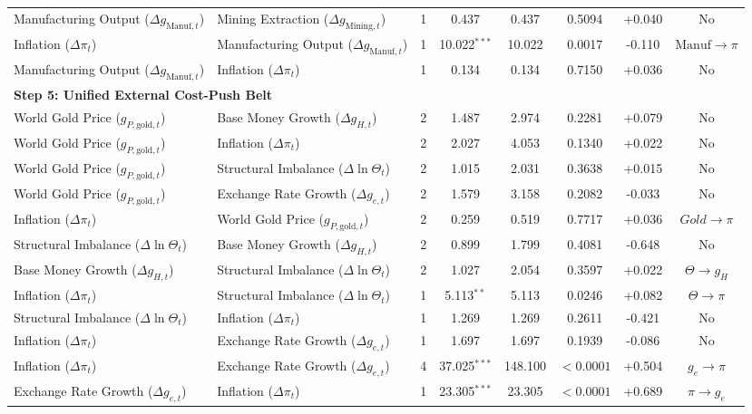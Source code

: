\begin{table}[htbp]
{\begin{tabular}{llcccccc}
Manufacturing Output ($\Delta g_{\text{Manuf},t}$) & Mining Extraction ($\Delta g_{\text{Mining},t}$) & 1 & 0.437 & 0.437 & 0.5094 & +0.040 & No \\
Inflation ($\Delta \pi_t$) & Manufacturing Output ($\Delta g_{\text{Manuf},t}$) & 1 & 10.022$^{***}$ & 10.022 & 0.0017 & -0.110 & $\text{Manuf} \to \pi$ \\
Manufacturing Output ($\Delta g_{\text{Manuf},t}$) & Inflation ($\Delta \pi_t$) & 1 & 0.134 & 0.134 & 0.7150 & +0.036 & No \\
\multicolumn{8}{l}{\textbf{Step 5: Unified External Cost-Push Belt}} \\[0.15em]
World Gold Price ($g_{P,\text{gold},t}$) & Base Money Growth ($\Delta g_{H,t}$) & 2 & 1.487 & 2.974 & 0.2281 & +0.079 & No \\
World Gold Price ($g_{P,\text{gold},t}$) & Inflation ($\Delta \pi_t$) & 2 & 2.027 & 4.053 & 0.1340 & +0.022 & No \\
World Gold Price ($g_{P,\text{gold},t}$) & Structural Imbalance ($\Delta \ln \Theta_t$) & 2 & 1.015 & 2.031 & 0.3638 & +0.015 & No \\
World Gold Price ($g_{P,\text{gold},t}$) & Exchange Rate Growth ($\Delta g_{e,t}$) & 2 & 1.579 & 3.158 & 0.2082 & -0.033 & No \\
Inflation ($\Delta \pi_t$) & World Gold Price ($g_{P,\text{gold},t}$) & 2 & 0.259 & 0.519 & 0.7717 & +0.036 & $Gold \to \pi$ \\
Structural Imbalance ($\Delta \ln \Theta_t$) & Base Money Growth ($\Delta g_{H,t}$) & 2 & 0.899 & 1.799 & 0.4081 & -0.648 & No \\
Base Money Growth ($\Delta g_{H,t}$) & Structural Imbalance ($\Delta \ln \Theta_t$) & 2 & 1.027 & 2.054 & 0.3597 & +0.022 & $\Theta \to g_H$ \\
Inflation ($\Delta \pi_t$) & Structural Imbalance ($\Delta \ln \Theta_t$) & 1 & 5.113$^{**}$ & 5.113 & 0.0246 & +0.082 & $\Theta \to \pi$ \\
Structural Imbalance ($\Delta \ln \Theta_t$) & Inflation ($\Delta \pi_t$) & 1 & 1.269 & 1.269 & 0.2611 & -0.421 & No \\
Inflation ($\Delta \pi_t$) & Exchange Rate Growth ($\Delta g_{e,t}$) & 1 & 1.697 & 1.697 & 0.1939 & -0.086 & No \\
Inflation ($\Delta \pi_t$) & Exchange Rate Growth ($\Delta g_{e,t}$) & 4 & 37.025$^{***}$ & 148.100 & $< 0.0001$ & +0.504 & $g_e \to \pi$ \\
Exchange Rate Growth ($\Delta g_{e,t}$) & Inflation ($\Delta \pi_t$) & 1 & 23.305$^{***}$ & 23.305 & $< 0.0001$ & +0.689 & $\pi \to g_e$ \\

\end{tabular}}
\end{table}
